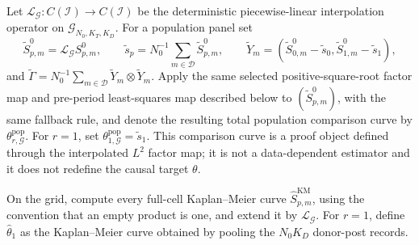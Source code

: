 Let \(\mathcal L_{\mathcal G}:C(\mathcal I)\to C(\mathcal I)\) be the deterministic piecewise-linear interpolation operator on \(\mathcal G_{N_0,K_T,K_D}\). For a population panel set
\[
 \widetilde S^0_{p,m}=\mathcal L_{\mathcal G}S^0_{p,m},
 \qquad
 \widetilde s_p=N_0^{-1}\sum_{m\in\mathcal D}\widetilde S^0_{p,m},
 \qquad
 \widetilde Y_m=(\widetilde S^0_{0,m}-\widetilde s_0,
                         \widetilde S^0_{1,m}-\widetilde s_1),
\]
and \(\widetilde\Gamma=N_0^{-1}\sum_{m\in\mathcal D}\widetilde Y_m\otimes\widetilde Y_m\). Apply the same selected positive-square-root factor map and pre-period least-squares map described below to \((\widetilde S^0_{p,m})\), with the same fallback rule, and denote the resulting total population comparison curve by \(\theta^{\mathrm{pop}}_{r,\mathcal G}\). For \(r=1\), set \(\theta^{\mathrm{pop}}_{1,\mathcal G}=\widetilde s_1\). This comparison curve is a proof object defined through the interpolated \(L^2\) factor map; it is not a data-dependent estimator and it does not redefine the causal target \(\theta\).

On the grid, compute every full-cell Kaplan--Meier curve \(\widehat S^{\mathrm{KM}}_{p,m}\), using the convention that an empty product is one, and extend it by \(\mathcal L_{\mathcal G}\). For \(r=1\), define \(\widehat\theta_1\) as the Kaplan--Meier curve obtained by pooling the \(N_0K_D\) donor-post records.

